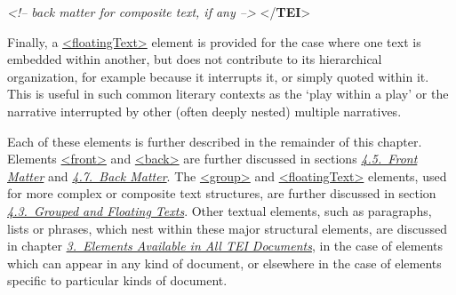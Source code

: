 \begin{shaded}
\hspace*{1em}\mbox{}\newline 
\hspace*{1em}\mbox{}\newline 
\textit{<!-- back matter for composite text, if any -->}\mbox{}\newline 
\hspace*{1em}\mbox{}\newline 
{}\mbox{}\newline 
{</\textbf{TEI}>}\end{shaded}\egroup\par \par
Finally, a \hyperref[TEI.floatingText]{<floatingText>} element is provided for the case where one text is embedded within another, but does not contribute to its hierarchical organization, for example because it interrupts it, or simply quoted within it. This is useful in such common literary contexts as the ‘play within a play’ or the narrative interrupted by other (often deeply nested) multiple narratives.\par
Each of these elements is further described in the remainder of this chapter. Elements \hyperref[TEI.front]{<front>} and \hyperref[TEI.back]{<back>} are further discussed in sections \textit{\hyperref[DSFRONT]{4.5.\ Front Matter}} and \textit{\hyperref[DSBACK]{4.7.\ Back Matter}}. The \hyperref[TEI.group]{<group>} and \hyperref[TEI.floatingText]{<floatingText>} elements, used for more complex or composite text structures, are further discussed in section \textit{\hyperref[DSGRPF]{4.3.\ Grouped and Floating Texts}}. Other textual elements, such as paragraphs, lists or phrases, which nest within these major structural elements, are discussed in chapter \textit{\hyperref[CO]{3.\ Elements Available in All TEI Documents}}, in the case of elements which can appear in any kind of document, or elsewhere in the case of elements specific to particular kinds of document.
